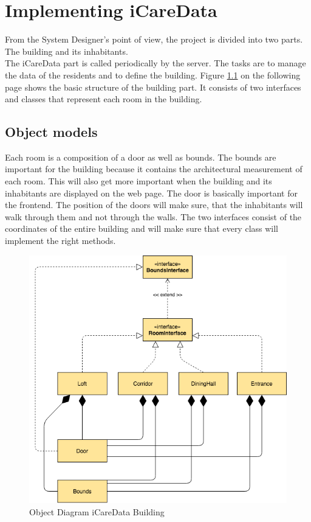 \chapter{Implementing iCareData}
\label{chap:iCareData}
From the System Designer's point of view, the project is divided into two parts. The building and its inhabitants. 
\\
The iCareData part is called periodically by the server. The tasks are to manage the data of the residents and to define the building. Figure \ref{fig:iCareDataBuilding} on the following page shows the basic structure of the building part. It consists of two interfaces and classes that represent each room in the building. 
\section{Object models}
Each room is a composition of a door as well as bounds. The bounds are important for the building because it contains the architectural measurement of each room. This will also get more important when the building and its inhabitants are displayed on the web page. The door is basically important for the frontend. The position of the doors will make sure, that the inhabitants will walk through them and not through the walls. The two interfaces consist of the coordinates of the entire building and will make sure that every class will implement the right methods.
\begin{figure}[h]
	\centering
	\includegraphics[width=\textwidth]{images/iCareDataBuilding}
	\caption{Object Diagram iCareData Building}
	\label{fig:iCareDataBuilding}
\end{figure}
